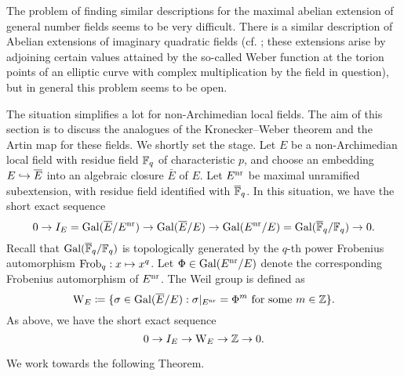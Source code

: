 \documentclass[../main.tex]{subfiles}
\begin{document}
The problem of finding similar descriptions for the maximal abelian extension of
general number fields seems to be very difficult. There is a similar description 
of Abelian extensions of imaginary quadratic fields (cf. \cite[Chapter II,
§5]{silverman1994advanced}; these extensions arise by adjoining certain values attained
by the so-called Weber function at the torion points of an elliptic curve with complex
multiplication by the field in question), but in general this problem seems to be open.

The situation simplifies a lot for non-Archimedian local fields. 
The aim of this section is to discuss the analogues of the 
Kronecker--Weber theorem and the Artin map for these fields. We shortly set the
stage. Let $E$ be a non-Archimedian local field with residue field $\mathbb{F}_q$ of
characteristic $p$, and choose an embedding $E \hookrightarrow \overline E$ into an algebraic
closure $\bar E$ of $E$. Let $E^{\mathrm{nr}}$ be maximal unramified subextension, with
residue field identified with ${\overline {\mathbb{F}}_q}$.
In this situation, we have the short exact sequence
\begin{equation*}
  0 \to I_E = \operatorname{Gal}(\overline E/ E^{\mathrm{nr}}) \to \operatorname{Gal}(\overline E/E) \to \operatorname{Gal}(E^{\mathrm{nr}} /E) =
  \operatorname{Gal}(\overline {\mathbb{F}}_q /\mathbb{F}_q) \to 0.
\end{equation*}
Recall that $\operatorname{Gal}({\overline {\mathbb{F}}_q}/\mathbb{F}_q)$ is topologically generated by the $q$-th power
Frobenius automorphism $\mathrm{Frob}_q: x \mapsto x^q$. Let $\Phi \in \operatorname{Gal}(E^{\mathrm{nr}} /E)$ 
denote the corresponding Frobenius automorphism of $E^{\mathrm{nr}}$. 
The Weil group is defined as
\begin{equation*}
  \mathrm W_E \coloneq \{\sigma \in \operatorname{Gal}(\overline E/E) : \sigma|_{E^{\mathrm{nr}}} = \Phi^m
  \text{ for some } m \in \mathbb{Z}\}.
\end{equation*}
As above, we have the short exact sequence
\begin{equation*}
  0 \to I_E \to \mathrm W_E \to \mathbb{Z} \to 0.
\end{equation*}

We work towards the following Theorem.
\end{document}
